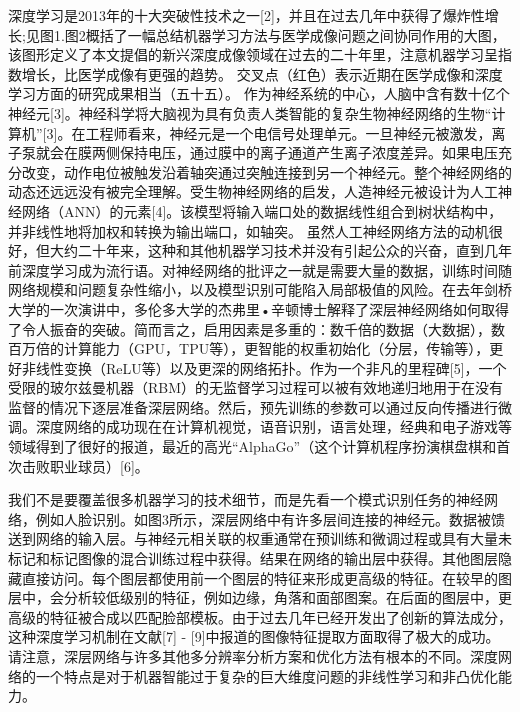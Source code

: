 深度学习是2013年的十大突破性技术之一[2]，并且在过去几年中获得了爆炸性增长;见图1.图2概括了一幅总结机器学习方法与医学成像问题之间协同作用的大图，该图形定义了本文提倡的新兴深度成像领域在过去的二十年里，注意机器学习呈指数增长，比医学成像有更强的趋势。 交叉点（红色）表示近期在医学成像和深度学习方面的研究成果相当（五十五）。
作为神经系统的中心，人脑中含有数十亿个神经元[3]。神经科学将大脑视为具有负责人类智能的复杂生物神经网络的生物“计算机”[3]。在工程师看来，神经元是一个电信号处理单元。一旦神经元被激发，离子泵就会在膜两侧保持电压，通过膜中的离子通道产生离子浓度差异。如果电压充分改变，动作电位被触发沿着轴突通过突触连接到另一个神经元。整个神经网络的动态还远远没有被完全理解。受生物神经网络的启发，人造神经元被设计为人工神经网络（ANN）的元素[4]。该模型将输入端口处的数据线性组合到树状结构中，并非线性地将加权和转换为输出端口，如轴突。
虽然人工神经网络方法的动机很好，但大约二十年来，这种和其他机器学习技术并没有引起公众的兴奋，直到几年前深度学习成为流行语。对神经网络的批评之一就是需要大量的数据，训练时间随网络规模和问题复杂性缩小，以及模型识别可能陷入局部极值的风险。在去年剑桥大学的一次演讲中，多伦多大学的杰弗里•辛顿博士解释了深层神经网络如何取得了令人振奋的突破。简而言之，启用因素是多重的：数千倍的数据（大数据），数百万倍的计算能力（GPU，TPU等），更智能的权重初始化（分层，传输等），更好非线性变换（ReLU等）以及更深的网络拓扑。作为一个非凡的里程碑[5]，一个受限的玻尔兹曼机器（RBM）的无监督学习过程可以被有效地递归地用于在没有监督的情况下逐层准备深层网络。然后，预先训练的参数可以通过反向传播进行微调。深度网络的成功现在在计算机视觉，语音识别，语言处理，经典和电子游戏等领域得到了很好的报道，最近的高光“AlphaGo”（这个计算机程序扮演棋盘棋和首次击败职业球员）[6]。

我们不是要覆盖很多机器学习的技术细节，而是先看一个模式识别任务的神经网络，例如人脸识别。如图3所示，深层网络中有许多层间连接的神经元。数据被馈送到网络的输入层。与神经元相关联的权重通常在预训练和微调过程或具有大量未标记和标记图像的混合训练过程中获得。结果在网络的输出层中获得。其他图层隐藏直接访问。每个图层都使用前一个图层的特征来形成更高级的特征。在较早的图层中，会分析较低级别的特征，例如边缘，角落和面部图案。在后面的图层中，更高级的特征被合成以匹配脸部模板。由于过去几年已经开发出了创新的算法成分，这种深度学习机制在文献[7] - [9]中报道的图像特征提取方面取得了极大的成功。请注意，深层网络与许多其他多分辨率分析方案和优化方法有根本的不同。深度网络的一个特点是对于机器智能过于复杂的巨大维度问题的非线性学习和非凸优化能力。 

